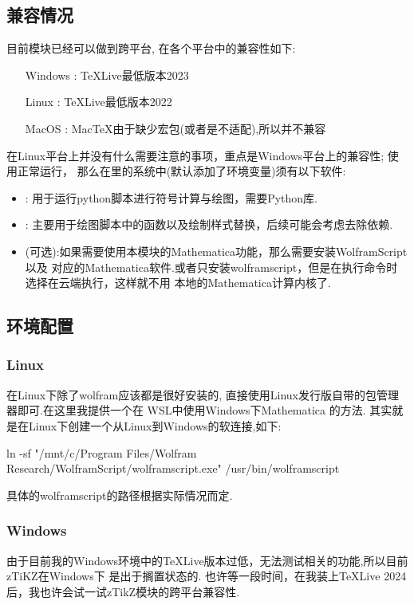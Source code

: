 \subsection{兼容情况}
目前模块已经可以做到跨平台, 在各个平台中的兼容性如下:

\hspace*{10em}\parbox{8cm}{
\begin{itemize}
    \item[Windows]: \TeX{}Live最低版本2023
    \item[Linux]: \TeX{}Live最低版本2022
    \item[MacOS]: Mac\TeX{}由于缺少宏包(或者是不适配),所以并不兼容
\end{itemize}}

在Linux平台上并没有什么需要注意的事项，重点是Windows平台上的兼容性; 使用正常运行，
那么在里的系统中(默认添加了环境变量)须有以下软件:
\begin{itemize}
    \item {}: 用于运行python脚本进行符号计算与绘图，需要Python库.
    \item {}: 主要用于绘图脚本中的函数以及绘制样式替换，后续可能会考虑去除依赖.
    \item {}(可选):如果需要使用本模块的Mathematica功能，那么需要安装WolframScript以及
        对应的Mathematica软件.或者只安装wolframscript，但是在执行命令时选择在云端执行，这样就不用
        本地的Mathematica计算内核了. 
\end{itemize}

\subsection{环境配置}
\subsubsection{Linux}
在Linux下除了wolfram应该都是很好安装的, 直接使用Linux发行版自带的包管理器即可.在这里我提供一个在
WSL中使用Windows下Mathematica 的方法. 其实就是在Linux下创建一个从Linux到Windows的软连接,如下:

\begin{codeprint}
ln -sf "/mnt/c/Program Files/Wolfram Research/WolframScript/wolframscript.exe" /usr/bin/wolframscript    
\end{codeprint}

具体的wolframscript的路径根据实际情况而定.

\subsubsection{Windows}
由于目前我的Windows环境中的\TeX{}Live版本过低，无法测试相关的功能,所以目前zTiKZ在Windows下
是出于搁置状态的.
也许等一段时间，在我装上\TeX{}Live 2024后，我也许会试一试zTikZ模块的跨平台兼容性.

